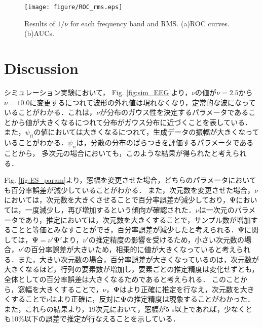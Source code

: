 \documentclass[journal]{IEEEtran}
\begin{document}
\begin{figure}[!t] %
\centering
\texttt{[image: figure/ROC\_rms.eps]}
\caption{Results of $1/\nu$ for each frequency band and RMS. (a)ROC curves. (b)AUCs. }
\label{fig:roc}
\end{figure}


\section{Discussion}
シミュレーション実験において，
Fig. \ref{fig:sim_EEG}より，$\nu$の値が$\nu = 2.5$から$\nu = 10.0$に変更するにつれて波形の外れ値は現れなくなり，定常的な波になっていることがわかる．これは，$\nu$が分布のガウス性を決定するパラメータであることから値が大きくなるにつれて分布がガウス分布に近づくことを表している．
また，$\psi_{ii}$の値においては大きくなるにつれて，生成データの振幅が大きくなっていることがわかる．$\psi_{ii}$は，分散の分布のばらつきを評価するパラメータであることから\cite{furui2019scale}，
多次元の場合においても，このような結果が得られたと考えられる．

Fig. \ref{fig:ES_param}より，窓幅を変更させた場合，どちらのパラメータにおいても百分率誤差が減少していることがわかる．
また，次元数を変更させた場合，$\nu$においては，次元数を大きくさせることで百分率誤差が減少しており，$\mathbf{\Psi}$においては，一度減少し，再び増加するという傾向が確認された．$\nu$は一次元のパラメータであり，推定においては，次元数を大きくすることで，サンプル数が増加することと等価とみなすことができ，百分率誤差が減少したと考えられる．$\mathbf{\Psi}$に関しては，$\mathbf{\Psi} = \nu' \mathbf{\Psi}'$より，$\nu'$の推定精度の影響を受けるため，小さい次元数の場合，$\nu'$の百分率誤差が大きいため，相乗的に値が大きくなっていると考えられる．また，大きい次元数の場合，百分率誤差が大きくなっているのは，次元数が大きくなるほど，行列の要素数が増加し，要素ごとの推定精度は変化せずとも，全体としての百分率誤差は大きくなるためであると考えられる．
このことから，窓幅を大きくすることで，$\nu$，$\mathbf{\Psi}$はより正確に推定を行なえ，次元数を大きくすることで$\nu$はより正確に，反対に$\mathbf{\Psi}$の推定精度は現象することがわかった．また，これらの結果より，19次元において，窓幅が5 s以上であれば，少なくとも10\%以下の誤差で推定が行なえることを示している．
\end{document}

